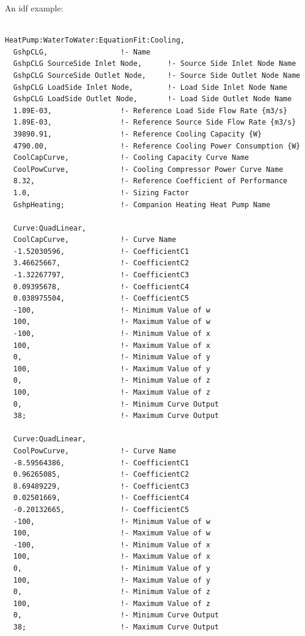 An idf example:

\begin{lstlisting}

HeatPump:WaterToWater:EquationFit:Cooling,
  GshpCLG,                 !- Name
  GshpCLG SourceSide Inlet Node,      !- Source Side Inlet Node Name
  GshpCLG SourceSide Outlet Node,     !- Source Side Outlet Node Name
  GshpCLG LoadSide Inlet Node,        !- Load Side Inlet Node Name
  GshpCLG LoadSide Outlet Node,       !- Load Side Outlet Node Name
  1.89E-03,                !- Reference Load Side Flow Rate {m3/s}
  1.89E-03,                !- Reference Source Side Flow Rate {m3/s}
  39890.91,                !- Reference Cooling Capacity {W}
  4790.00,                 !- Reference Cooling Power Consumption {W}
  CoolCapCurve,            !- Cooling Capacity Curve Name
  CoolPowCurve,            !- Cooling Compressor Power Curve Name
  8.32,                    !- Reference Coefficient of Performance
  1.0,                     !- Sizing Factor
  GshpHeating;             !- Companion Heating Heat Pump Name

  Curve:QuadLinear,
  CoolCapCurve,            !- Curve Name
  -1.52030596,             !- CoefficientC1
  3.46625667,              !- CoefficientC2
  -1.32267797,             !- CoefficientC3
  0.09395678,              !- CoefficientC4
  0.038975504,             !- CoefficientC5
  -100,                    !- Minimum Value of w
  100,                     !- Maximum Value of w
  -100,                    !- Minimum Value of x
  100,                     !- Maximum Value of x
  0,                       !- Minimum Value of y
  100,                     !- Maximum Value of y
  0,                       !- Minimum Value of z
  100,                     !- Maximum Value of z
  0,                       !- Minimum Curve Output
  38;                      !- Maximum Curve Output

  Curve:QuadLinear,
  CoolPowCurve,            !- Curve Name
  -8.59564386,             !- CoefficientC1
  0.96265085,              !- CoefficientC2
  8.69489229,              !- CoefficientC3
  0.02501669,              !- CoefficientC4
  -0.20132665,             !- CoefficientC5
  -100,                    !- Minimum Value of w
  100,                     !- Maximum Value of w
  -100,                    !- Minimum Value of x
  100,                     !- Maximum Value of x
  0,                       !- Minimum Value of y
  100,                     !- Maximum Value of y
  0,                       !- Minimum Value of z
  100,                     !- Maximum Value of z
  0,                       !- Minimum Curve Output
  38;                      !- Maximum Curve Output
\end{lstlisting}

